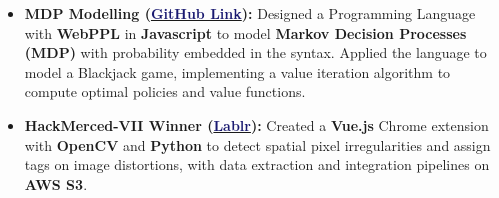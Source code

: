 \documentclass[letterpaper,11pt]{article}
\begin{document}
\begin{itemize}[leftmargin=0.15in, label={}]
	\small
  \item \textbf{MDP Modelling (\href{https://github.com/samz331/blackjack}{\textcolor{MidnightBlue}{GitHub Link}}):}
	      {Designed a Programming Language with \textbf{WebPPL} in \textbf{Javascript} to model \textbf{Markov Decision Processes (MDP)} with probability embedded in the syntax. Applied the language to model a Blackjack game, implementing a value iteration algorithm to compute optimal policies and value functions.} \vspace{-4pt}



  \item \textbf{HackMerced-VII Winner (\href{https://github.com/saikurelli/Hackathon-Chrome-Extension}{\textcolor{MidnightBlue}{Lablr}}):}
	      {Created a \textbf{Vue.js} Chrome extension with \textbf{OpenCV} and \textbf{Python} to detect spatial pixel irregularities and assign tags on image distortions, with data extraction and integration pipelines on \textbf{AWS S3}.} \vspace{-4pt}

\end{itemize}

\end{document}
